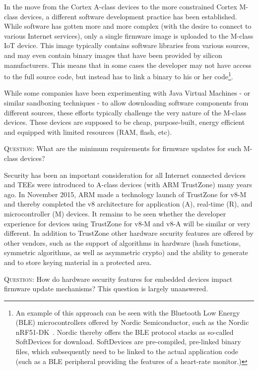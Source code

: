 \documentclass[peerreview, a4paper, 7pt]{IEEEtran}
\begin{document}
In the move from the Cortex A-class devices to the more constrained Cortex M-class devices, a different software development practice has been established. While software has gotten more and more complex (with the desire to connect to various Internet services), only a single firmware image is uploaded to the M-class IoT device. This image typically contains software libraries from various sources, and may even contain binary images that have been provided by silicon manufacturers. This means that in some cases the developer may not have access to the full source code, but instead has to link a binary to his or her code\footnote{An example of this approach can be seen with the Bluetooth Low Energy (BLE) microcontrollers offered by Nordic Semiconductor, such as the Nordic nRF51-DK~\cite{nRF51-DK}. Nordic thereby offers the BLE protocol stacks as so-called SoftDevices for download. SoftDevices are pre-compiled, pre-linked binary files, which subsequently need to be linked to the actual application code (such as a BLE peripheral providing the features of a heart-rate monitor.)}.

While some companies have been experimenting with Java Virtual Machines - or similar sandboxing techniques - to allow downloading software components from different sources, these efforts typically challenge the very nature of the M-class devices. These devices are supposed to be cheap, purpose-built, energy efficient and equipped with limited resources (RAM, flash, etc).  

\textsc{Question}: What are the minimum requirements for firmware updates for such M-class devices?

Security has been an important consideration for all Internet connected devices and TEEs were introduced to A-class devices (with ARM TrustZone) many years ago. In November 2015, ARM made a technology launch of TrustZone for v8-M~\cite{Trustzone} and thereby completed the v8 architecture for application (A), real-time (R), and microcontroller (M) devices. It remains to be seen whether the developer experience for devices using TrustZone for v8-M and v8-A will be similar or very different. In addition to TrustZone other hardware security features are offered by other vendors, such as the support of algorithms in hardware (hash functions, symmetric algorithms, as well as asymmetric crypto) and the ability to generate and to store keying material in a protected area.

\textsc{Question}: How do hardware security features for embedded devices impact firmware update mechanisms? This question is largely unanswered. 
\end{document}
